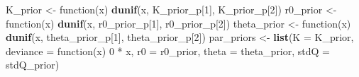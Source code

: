 \documentclass[author-year, review]{elsarticle} %
\newenvironment{Shaded}{}{}
\newcommand{\KeywordTok}[1]{\textcolor[rgb]{0.00,0.44,0.13}{\textbf{{#1}}}}
\newcommand{\DataTypeTok}[1]{\textcolor[rgb]{0.56,0.13,0.00}{{#1}}}
\newcommand{\DecValTok}[1]{\textcolor[rgb]{0.25,0.63,0.44}{{#1}}}
\newcommand{\NormalTok}[1]{{#1}}
\begin{document}
\begin{Shaded}
\begin{Highlighting}[]
\NormalTok{K_prior     <- function(x) }\KeywordTok{dunif}\NormalTok{(x, K_prior_p[}\DecValTok{1}\NormalTok{], K_prior_p[}\DecValTok{2}\NormalTok{])}
\NormalTok{r0_prior <- function(x) }\KeywordTok{dunif}\NormalTok{(x, r0_prior_p[}\DecValTok{1}\NormalTok{], r0_prior_p[}\DecValTok{2}\NormalTok{])}
\NormalTok{theta_prior <- function(x) }\KeywordTok{dunif}\NormalTok{(x, theta_prior_p[}\DecValTok{1}\NormalTok{], theta_prior_p[}\DecValTok{2}\NormalTok{])}
\NormalTok{par_priors  <- }\KeywordTok{list}\NormalTok{(}\DataTypeTok{K =} \NormalTok{K_prior, }\DataTypeTok{deviance =} \NormalTok{function(x) }\DecValTok{0} \NormalTok{* x, }
                    \DataTypeTok{r0 =} \NormalTok{r0_prior, }\DataTypeTok{theta =} \NormalTok{theta_prior,}
                    \DataTypeTok{stdQ =} \NormalTok{stdQ_prior)}
\end{Highlighting}
\end{Shaded}
\end{document}
